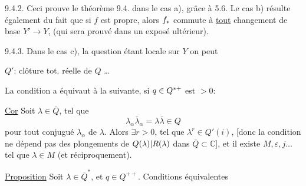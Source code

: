 9.4.2. Ceci prouve le théorème 9.4. dans le cas a), grâce à 5.6. Le cas b) résulte également du fait que si $f$ est propre, alors $f_{{*}}$ commute à \uline{tout} changement de base $Y'\longrightarrow Y$, (qui sera prouvé dans un exposé ultérieur).

9.4.3. Dans le cas c), la question étant locale sur $Y$ on peut


$Q'$: clôture tot. réelle de $Q$ \ldots


La condition a équivaut à la suivante, si $q\in Q^{*{+}}$ est $>0$:


\uline{Cor} Soit $\lambda\in\overline Q$, tel que 
\[
\lambda_\alpha\bar\lambda_\alpha=\lambda\bar\lambda\in Q
\]
pour tout conjugué $\lambda_\alpha$ de $\lambda$. Alors $\exists r>0$, tel que $\lambda^r\in Q'(i)$, [donc la condition ne dépend pas des plongements de ${Q(\lambda)|R(\lambda)}$ dans $\overline Q\subset\mathbb C$], et il existe $M,\varepsilon,j\ldots$  tel que $\lambda\in M$ (et réciproquement).

\uline{Proposition} Soit $\lambda\in\overline Q^*$, et $q\in Q^{++}$. Conditions équivalentes

